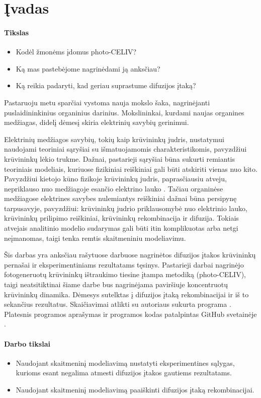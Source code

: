 \section{Įvadas}

\paragraph*{Tikslas}
\begin{itemize}
\item Kodėl žmonėms įdomus photo-CELIV?
\item Ką mas pastebėjome nagrinėdami ją anksčiau?
\item Ką reikia padaryti, kad geriau suprastume difuzijos įtaką?
\end{itemize}

Pastaruoju metu sparčiai vystoma nauja mokslo šaka, nagrinėjanti puslaidininkinius organinius darinius. Mokslininkai, kurdami naujas organines medžiagas, didelį dėmesį skiria elektrinių savybių gerinimui.

Elektrinių medžiagos savybių, tokių kaip krūvininkų judris, nustatymui naudojami teoriniai sąryšiai su išmatuojamomis charakteristikomis, pavyzdžiui krūvininkų lėkio trukme. Dažnai, pastarieji sąryšiai būna sukurti remiantis teoriniais modeliais, kuriuose fizikiniai reiškiniai gali būti atskiriti vienas nuo kito. Pavyzdžiui kietojo kūno fizikoje krūvininkų judris, paprasčiausiu atveju, nepriklauso nuo medžiagoje esančio elektrino lauko \cite{langevin}. Tačiau organinėse medžiagose elektrines savybes nulemiantys reiškiniai dažnai būna persipynę tarpusavyje, pavyzdžiui: krūvininkų judrio priklausomybė nuo elektrinio lauko, krūvininkų prilipimo reiškiniai, krūvininkų rekombinacija ir difuzija. Tokiais atvejais analitinio modelio sudarymas gali būti itin komplikuotas arba netgi neįmanomas, taigi tenka remtis skaitmeniniu modeliavimu. 


Šis darbas yra anksčiau rašytuose darbuose \cite{vytis:kursinis, juška:155202}
nagrinėtos difuzijos įtakos krūvininkų pernašai ir eksperimentiniams
rezultatams tęsinys. Pastarieji darbai nagrinėjo fotogeneruotų krūvininkų ištraukimo tiesine įtampa metodiką (photo-CELIV), taigi neatsitiktinai šiame darbe bus nagrinėjama paviršiuje koncentruotų krūvininkų dinamika. Dėmesys sutelktas į difuzijos įtaką
rekombinacijai ir iš to sekančius rezultatus.
Skaičiavimai atlikti su autoriaus sukurta programa
\cite{vytis:openreadings2010}. Platesnis programos aprašymas ir programos kodas patalpintas GitHub svetainėje \cite{doi@github}.

\paragraph{Darbo tikslai}
\begin{itemize}
\item Naudojant skaitmeninį modeliavimą nustatyti eksperimentines sąlygas, kurioms esant negalima atmesti difuzijos įtakos gautiems rezultatams.
\item Naudojant skaitmeninį modeliavimą paaiškinti difuzijos įtaką rekombinacijai.
\end{itemize}
